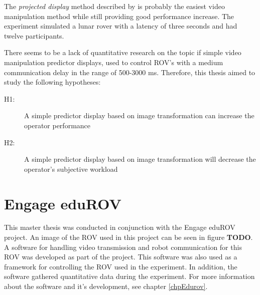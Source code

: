 The \textit{projected display} method described by \citep{Matheson2013} is probably the easiest video manipulation method while still providing good performance increase. The experiment simulated a lunar rover with a latency of three seconds and had twelve participants.

There seems to be a lack of quantitative research on the topic if simple video manipulation predictor displays, used to control ROV's with a medium communication delay in the range of 500-3000 ms. Therefore, this thesis aimed to study the following hypotheses:

\begin{description}
\item[H1:] A simple predictor display based on image transformation can 
 increase the operator performance
 
 \item[H2:] A simple predictor display based on image transformation will decrease the operator's subjective workload
\end{description}

\section{Engage eduROV}

This master thesis was conducted in conjunction with the Engage eduROV project. An image of the ROV used in this project can be seen in figure \textbf{TODO}. A software for handling video transmission and robot communication for this ROV was developed as part of the project. This software was also used as a framework for controlling the ROV used in the experiment. In addition, the software gathered quantitative data during the experiment. For more information about the software and it's development, see chapter \ref{chpEdurov}.

